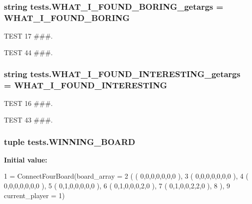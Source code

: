 \subsubsection[{W\+H\+A\+T\+\_\+\+I\+\_\+\+F\+O\+U\+N\+D\+\_\+\+B\+O\+R\+I\+N\+G\+\_\+getargs}]{\setlength{\rightskip}{0pt plus 5cm}string tests.\+W\+H\+A\+T\+\_\+\+I\+\_\+\+F\+O\+U\+N\+D\+\_\+\+B\+O\+R\+I\+N\+G\+\_\+getargs = \textquotesingle{}W\+H\+A\+T\+\_\+\+I\+\_\+\+F\+O\+U\+N\+D\+\_\+\+B\+O\+R\+I\+N\+G\textquotesingle{}}\label{namespacetests_af14077e20d51a6f1129ccf4dc8b4db3f}


T\+E\+S\+T 17 \#\#\#. 

T\+E\+S\+T 44 \#\#\#. \hypertarget{namespacetests_aa3a60dfc9a3b5ec5715a10aced17ed8e}{}
\subsubsection[{W\+H\+A\+T\+\_\+\+I\+\_\+\+F\+O\+U\+N\+D\+\_\+\+I\+N\+T\+E\+R\+E\+S\+T\+I\+N\+G\+\_\+getargs}]{\setlength{\rightskip}{0pt plus 5cm}string tests.\+W\+H\+A\+T\+\_\+\+I\+\_\+\+F\+O\+U\+N\+D\+\_\+\+I\+N\+T\+E\+R\+E\+S\+T\+I\+N\+G\+\_\+getargs = \textquotesingle{}W\+H\+A\+T\+\_\+\+I\+\_\+\+F\+O\+U\+N\+D\+\_\+\+I\+N\+T\+E\+R\+E\+S\+T\+I\+N\+G\textquotesingle{}}\label{namespacetests_aa3a60dfc9a3b5ec5715a10aced17ed8e}


T\+E\+S\+T 16 \#\#\#. 

T\+E\+S\+T 43 \#\#\#. \hypertarget{namespacetests_ade05507dd3f534c7d8b09196a056cdac}{}
\subsubsection[{W\+I\+N\+N\+I\+N\+G\+\_\+\+B\+O\+A\+R\+D}]{\setlength{\rightskip}{0pt plus 5cm}tuple tests.\+W\+I\+N\+N\+I\+N\+G\+\_\+\+B\+O\+A\+R\+D}\label{namespacetests_ade05507dd3f534c7d8b09196a056cdac}
{\bfseries Initial value\+:}
\begin{DoxyCode}
1 = ConnectFourBoard(board\_array =
2                                  ( ( 0,0,0,0,0,0,0 ),
3                                    ( 0,0,0,0,0,0,0 ),
4                                    ( 0,0,0,0,0,0,0 ),
5                                    ( 0,1,0,0,0,0,0 ),
6                                    ( 0,1,0,0,0,2,0 ),
7                                    ( 0,1,0,0,2,2,0 ),
8                                    ),
9                                  current\_player = 1)
\end{DoxyCode}
